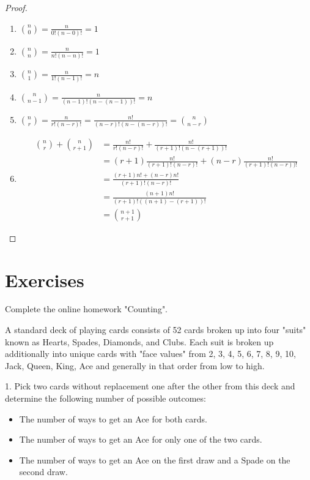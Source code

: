 \documentclass[10pt,]{book}
\theoremstyle{plain}
\theoremstyle{definition}
\theoremstyle{definition}
\theoremstyle{definition}
\numberwithin{equation}{section}
\begin{document}
\begin{proof}\hypertarget{proof-9}{}

	\leavevmode%
\begin{enumerate}
\item\hypertarget{li-80}{}\(\binom{n}{0} = \frac{n}{0!(n-0)!} = 1\)%
\item\hypertarget{li-81}{}\(\binom{n}{n} = \frac{n}{n!(n-n)!} = 1\)%
\item\hypertarget{li-82}{}\(\binom{n}{1} = \frac{n}{1!(n-1)!} = n\)%
\item\hypertarget{li-83}{}\(\binom{n}{n-1} = \frac{n}{(n-1)!(n-(n-1))!} = n\)%
\item\hypertarget{li-84}{}\(\binom{n}{r} = \frac{n}{r!(n-r)!} = \frac{n!}{(n-r)!(n-(n-r))!} = \binom{n}{n-r}\)%
\item\hypertarget{li-85}{}
		\begin{align*}
\binom{n}{r} + \binom{n}{r+1} & = \frac{n!}{r!(n-r)!} + \frac{n!}{(r+1)!(n-(r+1))!}\\
 & = (r+1) \frac{n!}{(r+1)!(n-r)!} + (n-r) \frac{n!}{(r+1)!(n-r))!}\\
 & = \frac{(r+1) n! + (n-r)n!}{(r+1)!(n-r)!}\\
 & = \frac{(n+1) n!}{(r+1)!((n+1)-(r+1))!}\\
 & = \binom{n+1}{r+1}
\end{align*}
\end{enumerate}

\end{proof}
\typeout{************************************************}
\typeout{************************************************}
\section[{Exercises}]{Exercises}\label{section-16}
Complete the online homework "Counting".%
\par

A standard deck of playing cards consists of 52 cards broken up into four "suits" known as Hearts, Spades, Diamonds, and Clubs. Each suit is broken up additionally into unique cards with "face values" from {2, 3, 4, 5, 6, 7, 8, 9, 10, Jack, Queen, King, Ace} and generally in that order from low to high.%
\par

1.  Pick two cards without replacement one after the other from this deck and determine the following number of possible outcomes:
\leavevmode%
\begin{itemize}[label=\textbullet]
\item{}The number of ways to get an Ace for both cards.%
\item{}The number of ways to get an Ace for only one of the two cards.%
\item{}The number of ways to get an Ace on the first draw and a Spade on the second draw.%
\end{itemize}
\end{document}
